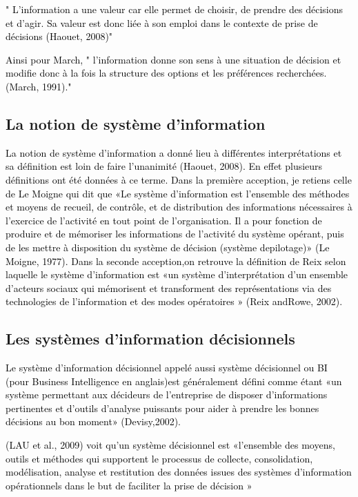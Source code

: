 \documentclass[a4paper,12pt]{report}
\begin{document}
\textcolor{black}{ " L’information a une valeur car elle permet de choisir, de prendre des décisions et d'agir.
Sa valeur est donc liée à son emploi dans le contexte de prise de décisions (Haouet, 2008)"}

\textcolor{black}{ Ainsi pour March, " l’information donne son sens à une situation de décision et modifie donc à la fois la structure des options et les préférences recherchées.(March, 1991)."}

\subsection{La notion de système d’information}
\textcolor{black}{La notion de système d’information a donné lieu à différentes interprétations et sa définition est loin de faire l’unanimité (Haouet, 2008). En effet plusieurs définitions ont été données à ce terme. Dans la première acception, je retiens celle de Le Moigne qui dit que «Le système d’information est l’ensemble des méthodes et moyens de recueil, de contrôle, et de distribution des informations nécessaires à l’exercice de l’activité en tout point de l’organisation. Il a pour fonction de produire et de mémoriser les informations de l’activité du système opérant, puis de les mettre à disposition du système de décision (système depilotage)» (Le Moigne, 1977). Dans la seconde acception,on retrouve la définition de Reix selon laquelle le système d’information est «un système d’interprétation d’un ensemble d’acteurs sociaux qui mémorisent et transforment des représentations via des technologies de l’information et des modes opératoires » (Reix andRowe, 2002).}

\subsection{Les systèmes d’information décisionnels}

\textcolor{black}{Le système d’information décisionnel appelé aussi système décisionnel ou BI (pour Business Intelligence en anglais)est généralement défini comme étant «un système permettant aux décideurs de l’entreprise de disposer d’informations pertinentes et d’outils d’analyse puissants pour aider à prendre les bonnes décisions au bon moment» (Devisy,2002).}

\textcolor{black}{(LAU et al., 2009) voit qu’un système décisionnel est «l’ensemble des moyens, outils et méthodes qui supportent le processus de collecte, consolidation, modélisation, analyse et restitution des données issues des systèmes d’information opérationnels dans le but de
faciliter la prise de décision »}
\end{document}
